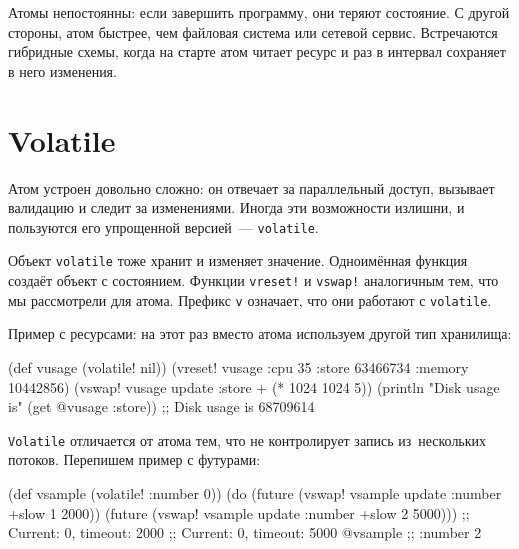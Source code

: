 
Атомы непостоянны: если завершить программу, они теряют состояние. С другой
стороны, атом быстрее, чем файловая система или сетевой сервис. Встречаются
гибридные схемы, когда на старте атом читает ресурс и раз в интервал сохраняет в
него изменения.

\section{Volatile}


Атом устроен довольно сложно: он отвечает за параллельный доступ, вызывает
валидацию и следит за изменениями. Иногда эти возможности излишни, и пользуются
его упрощенной версией~--- \verb|volatile|.


Объект \verb|volatile| тоже хранит и изменяет значение. Одноимённая функция
создаёт объект с состоянием. Функции \verb|vreset!| и \verb|vswap!|
аналогичным тем, что мы рассмотрели для атома. Префикс \verb|v| означает, что
они работают с \verb|volatile|.

Пример с ресурсами: на этот раз вместо атома используем другой тип хранилища:

\begin{english}
  \begin{clojure}
(def vusage (volatile! nil))
(vreset! vusage
         {:cpu 35
          :store 63466734
          :memory 10442856})
(vswap! vusage update :store + (* 1024 1024 5))
(println "Disk usage is" (get @vusage :store))
;; Disk usage is 68709614
  \end{clojure}
\end{english}

\verb|Volatile| отличается от атома тем, что не контролирует запись
из~нескольких потоков. Перепишем пример с футурами:

\begin{english}
  \begin{clojure}
(def vsample (volatile! {:number 0}))
(do (future (vswap! vsample update :number +slow 1 2000))
    (future (vswap! vsample update :number +slow 2 5000)))
;; Current: 0, timeout: 2000
;; Current: 0, timeout: 5000
@vsample ;; {:number 2}
  \end{clojure}
\end{english}


